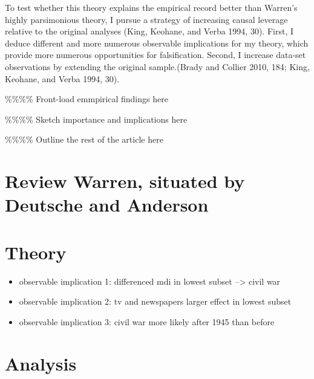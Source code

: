\documentclass[11pt,article,oneside]{memoir}
\begin{document}
To test whether this theory explains the empirical record better than
Warren's highly parsimonious theory, I pursue a strategy of increasing
causal leverage relative to the original analyses (King, Keohane, and
Verba 1994, 30). First, I deduce different and more numerous observable
implications for my theory, which provide more numerous opportunities
for falsification. Second, I increase data-set observations by extending
the original sample.(Brady and Collier 2010, 184; King, Keohane, and
Verba 1994, 30).

\%\%\%\% Front-load emmpirical findings here

\%\%\%\% Sketch importance and implications here

\%\%\%\% Outline the rest of the article here

\section{Review Warren, situated by Deutsche and
Anderson}\label{review-warren-situated-by-deutsche-and-anderson}

\section{Theory}\label{theory}

\begin{itemize}
\itemsep1pt\parskip0pt
\item
  observable implication 1: differenced mdi in lowest subset
  --\textgreater{} civil war
\item
  observable implication 2: tv and newspapers larger effect in lowest
  subset
\item
  observable implication 3: civil war more likely after 1945 than before
\end{itemize}

\section{Analysis}\label{analysis}
\end{document}
